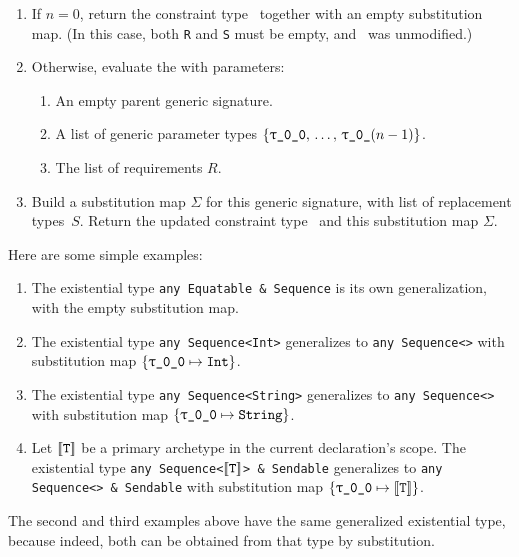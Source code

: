 \documentclass[../generics]{subfiles}
\begin{document}
\begin{algorithm}
\begin{enumerate}
\item If $n=0$, return the constraint type \tX\ together with an empty substitution map. (In this case, both \texttt{R} and \texttt{S} must be empty, and \tX\ was unmodified.)
\item Otherwise, evaluate the  with parameters:
\begin{enumerate}
\item An empty parent generic signature.
\item A list of generic parameter types $\{\rT,\,\ldots,\,\ttgp{0}{$(n - 1)$}\}$.
\item The list of requirements $R$.
\end{enumerate}
\item Build a substitution map $\Sigma$ for this generic signature, with list of replacement types~$S$. Return the updated constraint type \tX\ and this substitution map $\Sigma$.
\end{enumerate}
\end{algorithm}

\begin{example}\label{ex:generalize existential}
Here are some simple examples:
\begin{enumerate}
\item The existential type \texttt{any Equatable \& Sequence} is its own generalization, with the empty substitution map.
\item The existential type \texttt{any Sequence<Int>} generalizes to \texttt{any Sequence<\rT>} with substitution map $\SubstMap{\SubstType{\rT}{Int}}$.
\item The existential type \texttt{any Sequence<String>} generalizes to \texttt{any Sequence<\rT>} with substitution map $\SubstMap{\SubstType{\rT}{String}}$.
\item Let $[\![\texttt{T}]\!]$ be a primary archetype in the current declaration's scope. The existential type \texttt{any Sequence<$[\![\texttt{T}]\!]$> \& Sendable} generalizes to \texttt{any Sequence<\rT> \& Sendable} with substitution map $\SubstMap{\SubstType{\rT}{$\archetype{T}$}}$.
\end{enumerate}
The second and third examples above have the same generalized existential type, because indeed, both can be obtained from that type by substitution.
\end{example}
\end{document}
